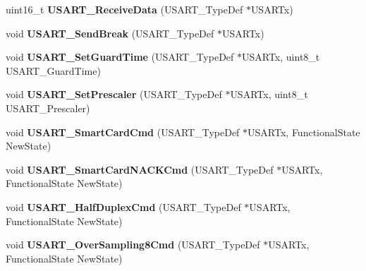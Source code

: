 \begin{DoxyCompactItemize}
\item 
\hypertarget{group__USART__Exported__Functions_gac67a91845b0b1d54d31bdfb1c5e9867c}{
uint16\_\-t {\bfseries USART\_\-ReceiveData} (USART\_\-TypeDef $\ast$USARTx)}
\label{group__USART__Exported__Functions_gac67a91845b0b1d54d31bdfb1c5e9867c}

\item 
\hypertarget{group__USART__Exported__Functions_ga39a3d33e23ee28529fa8f7259ce6811e}{
void {\bfseries USART\_\-SendBreak} (USART\_\-TypeDef $\ast$USARTx)}
\label{group__USART__Exported__Functions_ga39a3d33e23ee28529fa8f7259ce6811e}

\item 
\hypertarget{group__USART__Exported__Functions_gac4a35c6acd71ae7e0d67c1f03f0a8777}{
void {\bfseries USART\_\-SetGuardTime} (USART\_\-TypeDef $\ast$USARTx, uint8\_\-t USART\_\-GuardTime)}
\label{group__USART__Exported__Functions_gac4a35c6acd71ae7e0d67c1f03f0a8777}

\item 
\hypertarget{group__USART__Exported__Functions_gaf5da8f2eee8245425584d85d4f62cc33}{
void {\bfseries USART\_\-SetPrescaler} (USART\_\-TypeDef $\ast$USARTx, uint8\_\-t USART\_\-Prescaler)}
\label{group__USART__Exported__Functions_gaf5da8f2eee8245425584d85d4f62cc33}

\item 
\hypertarget{group__USART__Exported__Functions_gabd1347e244c623447151ba3a5e986c5f}{
void {\bfseries USART\_\-SmartCardCmd} (USART\_\-TypeDef $\ast$USARTx, FunctionalState NewState)}
\label{group__USART__Exported__Functions_gabd1347e244c623447151ba3a5e986c5f}

\item 
\hypertarget{group__USART__Exported__Functions_ga62e22f47e38aa53f2edce8771f7a5dfa}{
void {\bfseries USART\_\-SmartCardNACKCmd} (USART\_\-TypeDef $\ast$USARTx, FunctionalState NewState)}
\label{group__USART__Exported__Functions_ga62e22f47e38aa53f2edce8771f7a5dfa}

\item 
\hypertarget{group__USART__Exported__Functions_gaaa23b05fe0e1896bad90da7f82750831}{
void {\bfseries USART\_\-HalfDuplexCmd} (USART\_\-TypeDef $\ast$USARTx, FunctionalState NewState)}
\label{group__USART__Exported__Functions_gaaa23b05fe0e1896bad90da7f82750831}

\item 
\hypertarget{group__USART__Exported__Functions_ga3897bab07491d9239f8a238a9a7cddea}{
void {\bfseries USART\_\-OverSampling8Cmd} (USART\_\-TypeDef $\ast$USARTx, FunctionalState NewState)}
\label{group__USART__Exported__Functions_ga3897bab07491d9239f8a238a9a7cddea}


\end{DoxyCompactItemize}
